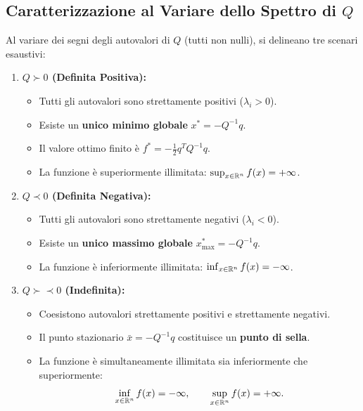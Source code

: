 \subsection{Caratterizzazione al Variare dello Spettro di \texorpdfstring{$Q$}{Q}}
Al variare dei segni degli autovalori di $Q$ (tutti non nulli), si delineano tre scenari esaustivi:
\begin{enumerate}
    \item \textbf{$Q \succ 0$ (Definita Positiva):}
    \begin{itemize}
        \item Tutti gli autovalori sono strettamente positivi ($\lambda_i > 0$).
        \item Esiste un \textbf{unico minimo globale} $x^* = -Q^{-1} q$.
        \item Il valore ottimo finito \`e $f^* = -\frac{1}{2} q^T Q^{-1} q$.
        \item La funzione \`e superiormente illimitata: $\sup_{x \in \mathbb{R}^n} f(x) = +\infty$.
    \end{itemize}
    \item \textbf{$Q \prec 0$ (Definita Negativa):}
    \begin{itemize}
        \item Tutti gli autovalori sono strettamente negativi ($\lambda_i < 0$).
        \item Esiste un \textbf{unico massimo globale} $x_{\max}^* = -Q^{-1} q$.
        \item La funzione \`e inferiormente illimitata: $\inf_{x \in \mathbb{R}^n} f(x) = -\infty$.
    \end{itemize}
    \item \textbf{$Q \succ\prec 0$ (Indefinita):}
    \begin{itemize}
        \item Coesistono autovalori strettamente positivi e strettamente negativi.
        \item Il punto stazionario $\bar{x} = -Q^{-1} q$ costituisce un \textbf{punto di sella}.
        \item La funzione \`e simultaneamente illimitata sia inferiormente che superiormente:
        \begin{equation}
            \inf_{x \in \mathbb{R}^n} f(x) = -\infty, \qquad \sup_{x \in \mathbb{R}^n} f(x) = +\infty.
        \end{equation}
    \end{itemize}
\end{enumerate}


\FloatBarrier
